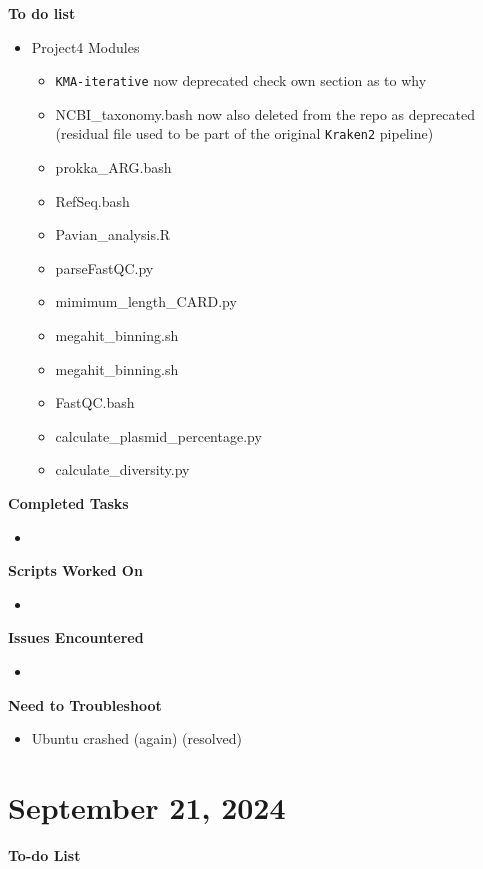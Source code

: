 \documentclass[11pt]{report}
\newcommand{\done}{\checkmark}
\begin{document}
{\textbf{To do list}
\begin{itemize}
	\item [\done] Project4 Modules
	\begin{itemize}
		\item [\done] \texttt{KMA-iterative} now deprecated check own section as to why
		\item [\done] NCBI\_taxonomy.bash now also deleted from the repo as deprecated (residual file used to be part of the original \texttt{Kraken2} pipeline)
		\item [\done] prokka\_ARG.bash
		\item [\done] RefSeq.bash
		\item [\done] Pavian\_analysis.R
		\item [\done] parseFastQC.py
		\item [\done] mimimum\_length\_CARD.py
		\item [\done] megahit\_binning.sh
		\item [\done] megahit\_binning.sh
		\item [\done] FastQC.bash
		\item [\done] calculate\_plasmid\_percentage.py
		\item [\done] calculate\_diversity.py
	\end{itemize}
\end{itemize}


\textbf{Completed Tasks} 
\begin{itemize}
	\item
\end{itemize}

\textbf{Scripts Worked On}
\begin{itemize}
	\item 
\end{itemize}


\textbf{Issues Encountered}
\begin{itemize}
	\item  
\end{itemize}

\textbf{Need to Troubleshoot}
\begin{itemize}
	\item [\done] Ubuntu crashed (again) (resolved)
\end{itemize}


\newpage
\section{September 21, 2024}
\textbf{To-do List} \\


}
\end{document}
